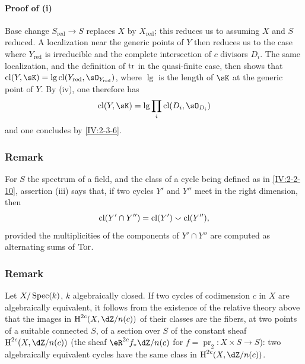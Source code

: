 \paragraph{Proof of (i)}
Base change $S_\text{red}\to S$ replaces $X$ by $X_\text{red}$; this
reduces us to assuming $X$ and $S$ reduced. A localization near
the generic points of $Y$ then reduces us to the case where
$Y_\text{red}$ is irreducible and the complete intersection of $c$
divisors $D_i$. The same localization, and the definition of $\operatorname{tr}$ in the
quasi-finite case, then shows that
$\cl(Y,\sK)=\operatorname{lg}\cl(Y_\text{red},\sO_{Y_\text{red}})$, where
$\operatorname{lg}$ is the length of $\sK$ at the generic point of $Y$.
By (iv), one therefore has
\[
  \cl(Y,\sK) = \operatorname{lg} \prod_i \cl(D_i,\sO_{D_i})
\]
and one concludes by \ref{IV:2-3-6}.




\subsubsection{Remark}\label{IV:2-3-9}

For $S$ the spectrum of a field, and the class of a cycle being defined as
in \ref{IV:2-2-10}, assertion (iii) says that, if two cycles $Y'$ and $Y''$ meet
in the right dimension, then
\[
  \operatorname{cl}(Y'\cap Y'') = \operatorname{cl}(Y')\smallsmile \operatorname{cl}(Y'')\text{,}
\]
provided the multiplicities of the components of $Y'\cap Y''$ are
computed as alternating sums of $\operatorname{Tor}$.




\subsubsection{Remark}\label{IV:2-3-10}

Let $X/\operatorname{Spec}(k)$, $k$ algebraically closed. If two cycles of codimension $c$
in $X$ are algebraically equivalent, it follows from the existence of the
relative theory above that the images in $\h^{2 c}(X,\dZ/n(c))$ of
their classes are the fibers, at two points of a suitable connected $S$, of a
section over $S$ of the constant sheaf $\h^{2 c}(X,\dZ/n(c))$ (the sheaf
$\eR^{2 c} f_\ast \dZ/n(c)$ for $f=\operatorname{pr}_2:X\times S\to S$): two
algebraically equivalent cycles have the same class in
$\h^{2 c}(X,\dZ/n(c))$.




















